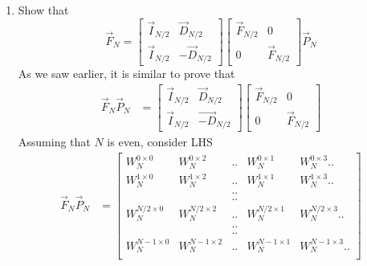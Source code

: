 \documentclass[journal,12pt,twocolumn]{IEEEtran}
\renewcommand\thesection{\arabic{section}}
\begin{document}
\begin{enumerate}[label=\arabic*.,ref=\thesection.\theenumi]
    \item Show that 
    \begin{equation}
    \vec{F}_{N}=
    \begin{bmatrix}
    \vec{I}_{N/2} & \vec{D}_{N/2} \\
    \vec{I}_{N/2} & -\vec{D}_{N/2}
    \end{bmatrix}
    \begin{bmatrix}
    \vec{F}_{N/2} & 0 \\
    0 & \vec{F}_{N/2}
    \end{bmatrix}
    \vec{P}_{N}
    \end{equation}
    \solution As we saw earlier, it is similar to prove that
     \begin{align}
       \vec{F}_{N}\vec{P}_{N} &= \begin{bmatrix}
                               \vec{I}_{N/2} & \vec{D}_{N/2} \\
                               \vec{I}_{N/2} & \vec{-D}_{N/2}
                                 \end{bmatrix}
                                  \begin{bmatrix}
                                    \vec{F}_{N/2} &  0 \\
                                     0             & \vec{F}_{N/2}
                                \end{bmatrix}
     \end{align}
    Assuming that $N$ is even, consider LHS
     \begin{align}
       \vec{F}_{N}\vec{P}_{N} &= \begin{bmatrix}
                                   W_{N}^{0 \times 0} & W_{N}^{0 \times 2} & ..& W_{N}^{0 \times 1} & W_{N}^{0 \times 3} .. \\
                                    W_{N}^{1 \times 0} & W_{N}^{1 \times 2 } &..& W_{N}^{1 \times 1} & W_{N}^{1 \times 3} .. \\
                                   & & ..&&  \\
                                   & & ..&& \\
                                   W_{N}^{N/2 \times 0} & W_{N}^{N/2 \times 2 } & ..& W_{N}^{N/2 \times 1} & W_{N}^{N/2 \times 3}..  \\
                                      & & ..&& \\
                                      && ..&&\\
                                      W_{N}^{N-1 \times 0} & W_{N}^{N-1 \times 2 } & .. & W_{N}^{N-1 \times 1} & W_{N}^{N-1 \times 3}..  \\ 

\end{bmatrix}
\end{align}
\end{enumerate}
\end{document}
